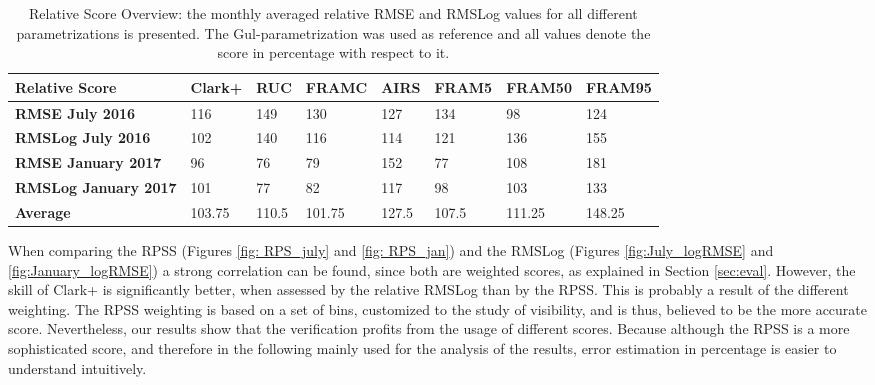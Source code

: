 \begin{table}[htb]
 \renewcommand{\arraystretch}{2.5}
    \tiny
        \centering
        \begin{tabularx}{\textwidth}{|l |X|X|X|X|X|X|X|}
        \hline
    \textbf{Relative Score}&  \textbf{Clark+}&	\textbf{RUC}	&\textbf{FRAMC}&	\textbf{AIRS}&	\textbf{FRAM5}&	\textbf{FRAM50}&	\textbf{FRAM95}\\
    \hline
    \hline
    \textbf{RMSE July 2016}&	116&	149	&130&	127&	134	&98&	124\\
    \hline
    \textbf{RMSLog July	2016}&102&	140&	116&	114&	121&	136	&155\\
    \hline
    \textbf{RMSE January 2017}&	96&	76&	79&	152&	77&	108&	181\\
    \hline
    \textbf{RMSLog January 2017}&	101&	77&	82&	117&	98&	103&	133\\
    \hline
    \textbf{Average}	&103.75&	110.5&	101.75&	127.5&	107.5&	111.25&	148.25\\
    \hline
    \end{tabularx}
    \caption{Relative Score Overview: the monthly averaged relative RMSE and RMSLog values for all different parametrizations is presented. The Gul-parametrization was used as reference and all values denote the score in percentage with respect to it.}
    \label{tab:scores}
\end{table}
When comparing the RPSS (Figures \ref{fig: RPS_july} and \ref{fig: RPS_jan}) and the RMSLog (Figures \ref{fig:July_logRMSE} and \ref{fig:January_logRMSE}) a strong correlation can be found, since both are weighted scores, as explained in Section \ref{sec:eval}. However, the skill of Clark+ is significantly better, when assessed by the relative RMSLog than by the RPSS. This is probably a result of the different weighting. The RPSS weighting is based on a set of bins, customized to the study of visibility, and is thus, believed to be the more accurate score. Nevertheless, our results show that the verification profits from the usage of different scores. Because although the RPSS is a more sophisticated score, and therefore in the following mainly used for the analysis of the results, error estimation in percentage is easier to understand intuitively.
 
